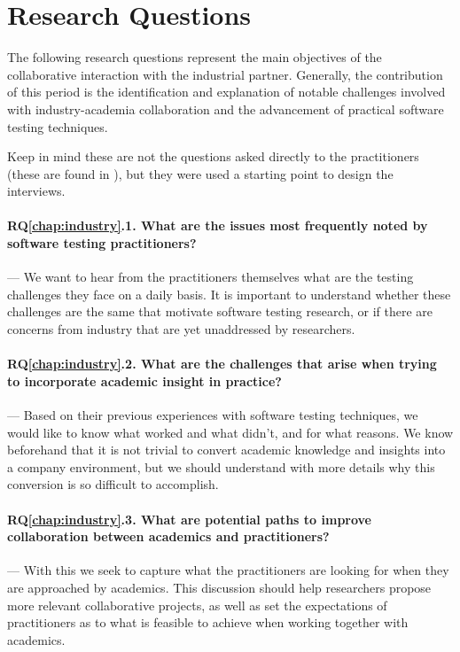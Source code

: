\section{Research Questions}
\label{sec:ind_rqs}

The following research questions represent the main objectives of the collaborative interaction with the industrial partner.
Generally, the contribution of this period is the identification and explanation of notable challenges involved with industry-academia collaboration and the advancement of practical software testing techniques.

Keep in mind these are not the questions asked directly to the practitioners (these are found in ), but they were used a starting point to design the interviews.

\paragraph{RQ\ref{chap:industry}.1. What are the issues most frequently noted by software testing practitioners?} --- We want to hear from the practitioners themselves what are the testing challenges they face on a daily basis.
It is important to understand whether these challenges are the same that motivate software testing research, or if there are concerns from industry that are yet unaddressed by researchers.

\paragraph{RQ\ref{chap:industry}.2. What are the challenges that arise when trying to incorporate academic insight in practice?} --- Based on their previous experiences with software testing techniques, we would like to know what worked and what didn't, and for what reasons.
We know beforehand that it is not trivial to convert academic knowledge and insights into a company environment, but we should understand with more details why this conversion is so difficult to accomplish.

\paragraph{RQ\ref{chap:industry}.3. What are potential paths to improve collaboration between academics and practitioners?} --- With this we seek to capture what the practitioners are looking for when they are approached by academics.
This discussion should help researchers propose more relevant collaborative projects, as well as set the expectations of practitioners as to what is feasible to achieve when working together with academics.


